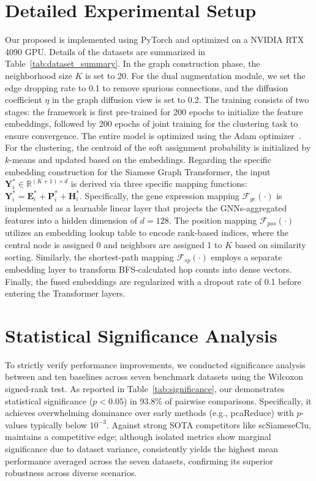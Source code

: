 \newpage
\twocolumn \flushbottom \sloppy
\begin{appendix}



\section{Detailed Experimental Setup}
\label{sec:setup}
Our proposed \method{} is implemented using PyTorch and optimized on a NVIDIA RTX 4090 GPU. Details of the datasets are summarized in Table~\ref{tab:dataset_summary}. In the graph construction phase, the neighborhood size $K$ is set to 20. For the dual augmentation module, we set the edge dropping rate to 0.1 to remove spurious connections, and the diffusion coefficient $\eta$ in the graph diffusion view is set to 0.2. The training consists of two stages: the framework is first pre-trained for 200 epochs to initialize the feature embeddings, followed by 200 epochs of joint training for the clustering task to ensure convergence. The entire model is optimized using the Adam optimizer~\cite{kingma2014adam}. For the clustering, the centroid of the soft assignment probability is initialized by $k$-means and updated based on the embeddings. Regarding the specific embedding construction for the Siamese Graph Transformer, the input $\bm{Y}_i^* \in \mathbb{R}^{(K+1)\times d}$ is derived via three specific mapping functions: $\bm{Y}_i^* = \bm{E}_i^* + \bm{P}_i^* + \bm{H}_i^*$. Specifically, the gene expression mapping $\mathcal{F}_{ge}(\cdot)$ is implemented as a learnable linear layer that projects the GNNs-aggregated features into a hidden dimension of $d=128$. The position mapping $\mathcal{F}_{pos}(\cdot)$ utilizes an embedding lookup table to encode rank-based indices, where the central node is assigned 0 and neighbors are assigned 1 to $K$ based on similarity sorting. Similarly, the shortest-path mapping $\mathcal{F}_{sp}(\cdot)$ employs a separate embedding layer to transform BFS-calculated hop counts into dense vectors. Finally, the fused embeddings are regularized with a dropout rate of 0.1 before entering the Transformer layers.



\section{Statistical Significance Analysis} To strictly verify performance improvements, we conducted significance analysis between \method{} and ten baselines across seven benchmark datasets using the Wilcoxon signed-rank test. As reported in Table~\ref{tab:significance}, our \method{} demonstrates statistical significance ($p < 0.05$) in 93.8\% of pairwise comparisons. Specifically, it achieves overwhelming dominance over early methods (e.g., pcaReduce) with $p$-values typically below $10^{-3}$. Against strong SOTA competitors like scSiameseClu, \method{} maintains a competitive edge; although isolated metrics show marginal significance due to dataset variance, \method{} consistently yields the highest mean performance averaged across the seven datasets, confirming its superior robustness across diverse scenarios.



\end{appendix}
